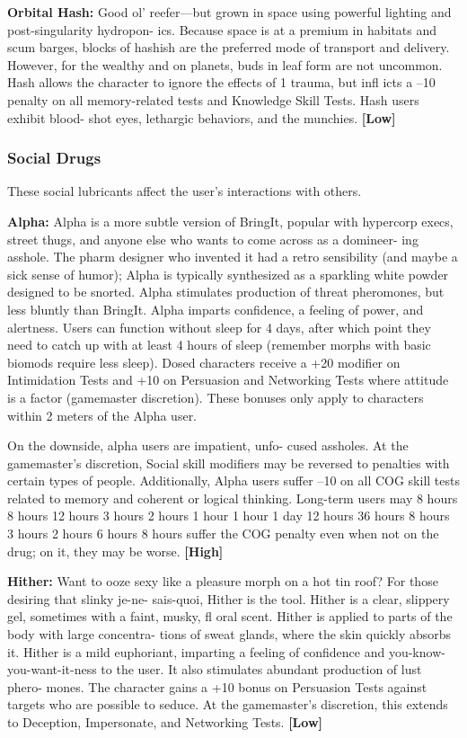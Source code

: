 \textbf{Orbital Hash:} Good ol' reefer—but grown in space 
using powerful lighting and post-singularity hydropon-
ics. Because space is at a premium in habitats and scum 
barges, blocks of hashish are the preferred mode of 
transport and delivery. However, for the wealthy and 
on planets, buds in leaf form are not uncommon. Hash 
allows the character to ignore the effects of 1 trauma, 
but infl icts a –10 penalty on all memory-related tests 
and Knowledge Skill Tests. Hash users exhibit blood-
shot eyes, lethargic behaviors, and the munchies. \textbf{[Low]}

\subsubsection{Social Drugs}

These social lubricants affect the user's interactions 
with others.

\textbf{Alpha:} Alpha is a more subtle version of BringIt, 
popular with hypercorp execs, street thugs, and 
anyone else who wants to come across as a domineer-
ing asshole. The pharm designer who invented it had 
a retro sensibility (and maybe a sick sense of humor); 
Alpha is typically synthesized as a sparkling white 
powder designed to be snorted. Alpha stimulates 
production of threat pheromones, but less bluntly 
than BringIt. Alpha imparts confidence, a feeling of 
power, and alertness. Users can function without sleep 
for 4 days, after which point they need to catch up 
with at least 4 hours of sleep (remember morphs with 
basic biomods require less sleep). Dosed characters 
receive a +20 modifier on Intimidation Tests and +10 
on Persuasion and Networking Tests where attitude is 
a factor (gamemaster discretion). These bonuses only 
apply to characters within 2 meters of the Alpha user.

On the downside, alpha users are impatient, unfo-
cused assholes. At the gamemaster's discretion, Social 
skill modifiers may be reversed to penalties with 
certain types of people. Additionally, Alpha users 
suffer –10 on all COG skill tests related to memory 
and coherent or logical thinking. Long-term users may 
8 hours
8 hours
12 hours
3 hours
2 hours
1 hour
1 hour
1 day
12 hours
36 hours
8 hours
3 hours
2 hours
6 hours
8 hours
suffer the COG penalty even when not on the drug; 
on it, they may be worse. \textbf{[High]}

\textbf{Hither:} Want to ooze sexy like a pleasure morph 
on a hot tin roof? For those desiring that slinky je-ne-
sais-quoi, Hither is the tool. Hither is a clear, slippery 
gel, sometimes with a faint, musky, fl oral scent. Hither 
is applied to parts of the body with large concentra-
tions of sweat glands, where the skin quickly absorbs 
it. Hither is a mild euphoriant, imparting a feeling of 
confidence and you-know-you-want-it-ness to the user. 
It also stimulates abundant production of lust phero-
mones. The character gains a +10 bonus on Persuasion 
Tests against targets who are possible to seduce. At the 
gamemaster's discretion, this extends to Deception, 
Impersonate, and Networking Tests. \textbf{[Low]}

